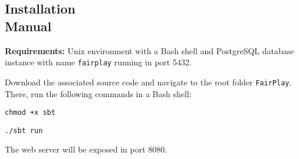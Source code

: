 \documentclass[12pt, a4paper, twoside]{article}
\begin{document}
\newpage

\begin{umaappendices}
  \section{Installation \\ Manual}

  \textbf{\large{Requirements:}} Unix environment with a Bash shell and PostgreSQL database instance with name \texttt{fairplay} running in port 5432.

  Download the associated source code and navigate to the root folder \texttt{FairPlay}.
  There, run the following commands in a Bash shell:
  
  \texttt{chmod +x sbt}
  
  \texttt{./sbt run}
  
  The web server will be exposed in port 8080.

\end{umaappendices}

\newpage

\end{document}
